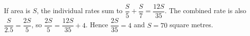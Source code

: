 If area is $S$, the individual rates sum to $\dfrac{S}{5}+\dfrac{S}{7}=\dfrac{12S}{35}$. The combined rate is also $\dfrac{S}{2.5}=\dfrac{2S}{5}$, so $\dfrac{2S}{5}=\dfrac{12S}{35}+4$. Hence $\dfrac{2S}{35}=4$ and $\boxed{S=70}$ square metres.
